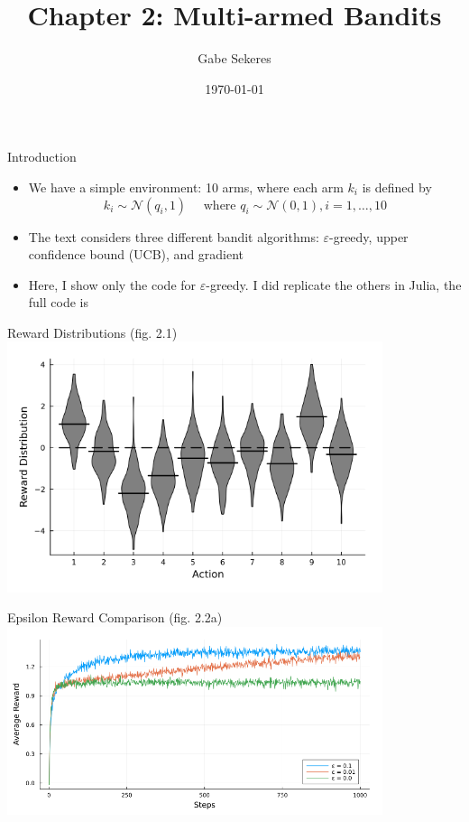 \documentclass{beamer}
\title{Chapter 2: Multi-armed Bandits}
\date{\today}
\author{Gabe Sekeres}
\institute{Cornell University}
\begin{document}
  \maketitle
  
\begin{frame}{Introduction}
	\begin{itemize}
		\item We have a simple environment: 10 arms, where each arm $k_i$ is defined by \[k_i \sim \mathcal{N}(q_i,1) \quad \text{ where } q_i \sim \mathcal{N}(0,1), i = 1,\dots,10\]
		\item The text considers three different bandit algorithms: $\varepsilon$-greedy, upper confidence bound (UCB), and gradient
		\item Here, I show only the code for $\varepsilon$-greedy. I did replicate the others in Julia, the full code is 
	\end{itemize}
\end{frame}
  
 \begin{frame}{Reward Distributions (fig. 2.1)}
 	\includegraphics[width=11cm]{ten_armed_testbed_violin.png}
 \end{frame}
  
  \begin{frame}{Epsilon Reward Comparison (fig. 2.2a)}
  	\includegraphics[width=11cm]{ten_armed_testbed_epsilon_greedy.png}
  \end{frame}
  
\end{document}
